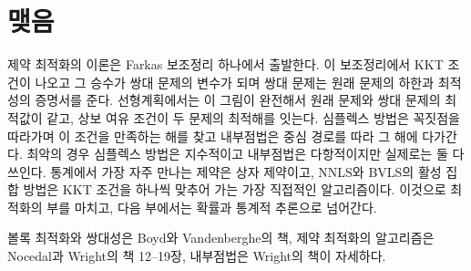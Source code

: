 \section{맺음}

제약 최적화의 이론은 Farkas 보조정리 하나에서 출발한다. 이 보조정리에서 KKT 조건이 나오고 그 승수가 쌍대 문제의 변수가 되며 쌍대 문제는 원래 문제의 하한과 최적성의 증명서를 준다. 선형계획에서는 이 그림이 완전해서 원래 문제와 쌍대 문제의 최적값이 같고, 상보 여유 조건이 두 문제의 최적해를 잇는다. 심플렉스 방법은 꼭짓점을 따라가며 이 조건을 만족하는 해를 찾고 내부점법은 중심 경로를 따라 그 해에 다가간다. 최악의 경우 심플렉스 방법은 지수적이고 내부점법은 다항적이지만 실제로는 둘 다 쓰인다. 통계에서 가장 자주 만나는 제약은 상자 제약이고, NNLS와 BVLS의 활성 집합 방법은 KKT 조건을 하나씩 맞추어 가는 가장 직접적인 알고리즘이다. 이것으로 최적화의 부를 마치고, 다음 부에서는 확률과 통계적 추론으로 넘어간다.

볼록 최적화와 쌍대성은 Boyd와 Vandenberghe의 책\cite{boyd2004convex}, 제약 최적화의 알고리즘은 Nocedal과 Wright의 책\cite{nocedal2006} 12--19장, 내부점법은 Wright의 책\cite{wright1997pdipm}이 자세하다.

\chapterreferences
